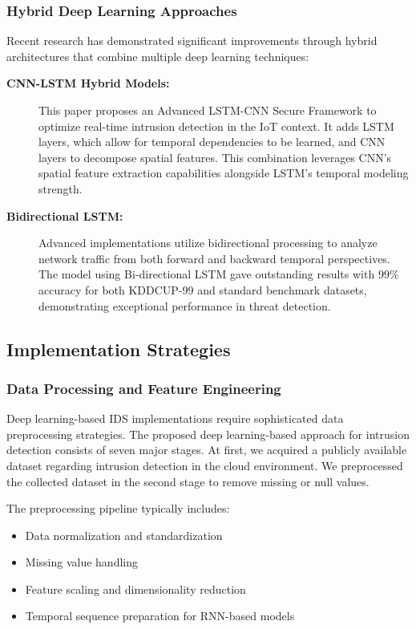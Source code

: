 \documentclass[12pt]{report}
\begin{document}
\subsubsection{Hybrid Deep Learning Approaches}
Recent research has demonstrated significant improvements through hybrid architectures that combine multiple deep learning techniques:

\begin{description}
    \item[\textbf{CNN-LSTM Hybrid Models:}] This paper proposes an Advanced LSTM-CNN Secure Framework to optimize real-time intrusion detection in the IoT context. It adds LSTM layers, which allow for temporal dependencies to be learned, and CNN layers to decompose spatial features. This combination leverages CNN's spatial feature extraction capabilities alongside LSTM's temporal modeling strength.

    \item[\textbf{Bidirectional LSTM:}] Advanced implementations utilize bidirectional processing to analyze network traffic from both forward and backward temporal perspectives. The model using Bi-directional LSTM gave outstanding results with 99\% accuracy for both KDDCUP-99 and standard benchmark datasets, demonstrating exceptional performance in threat detection.
\end{description}

\subsection{Implementation Strategies}

\subsubsection{Data Processing and Feature Engineering}
Deep learning-based IDS implementations require sophisticated data preprocessing strategies. The proposed deep learning-based approach for intrusion detection consists of seven major stages. At first, we acquired a publicly available dataset regarding intrusion detection in the cloud environment. We preprocessed the collected dataset in the second stage to remove missing or null values.

The preprocessing pipeline typically includes:
\begin{itemize}
    \item Data normalization and standardization
    \item Missing value handling
    \item Feature scaling and dimensionality reduction
    \item Temporal sequence preparation for RNN-based models
\end{itemize}
\end{document}
